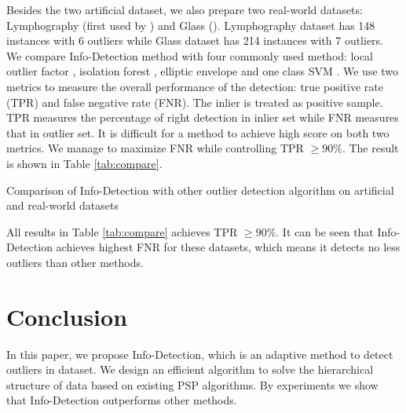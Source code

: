 \documentclass[runningheads]{llncs}
\begin{document}
Besides the two artificial dataset, we also prepare two real-world datasets: Lymphography (first used by \cite{Lazarevic}) and Glass (\cite{hics}). Lymphography dataset has 148 instances with 6 outliers while Glass dataset has 214 instances with 7 outliers. We compare Info-Detection method with four commonly used method: local outlier factor \cite{Breunig}, isolation forest \cite{if}, elliptic envelope \cite{rousseeuw1999fast} and one class SVM \cite{svm}. We use two metrics to measure the overall performance of the detection: true positive rate (TPR) and false negative rate (FNR). The inlier is treated as positive sample. TPR measures the percentage of right detection in inlier set while FNR measures that in outlier set. It is difficult for a method to achieve high score on both two metrics. We manage to maximize FNR while controlling TPR $\geq 90\%$. The result is shown in Table \ref{tab:compare}.
\begin{table}[!ht]
\centering
{}
\caption{Comparison of Info-Detection with other outlier detection algorithm on artificial and real-world datasets}\label{tab:compare}
\end{table}

All results in Table \ref{tab:compare} achieves TPR $\geq 90\%$. It can be seen that Info-Detection achieves highest FNR for these datasets, which means it detects no less outliers than other methods.

\section{Conclusion}\label{sec:Conclusion}
In this paper, we propose Info-Detection, which is an adaptive method to detect outliers in dataset. We design an efficient algorithm to solve the hierarchical structure of data based on existing PSP algorithms. By experiments we show that Info-Detection outperforms other methods.  
%
%
%


%
\appendix
\end{document}
